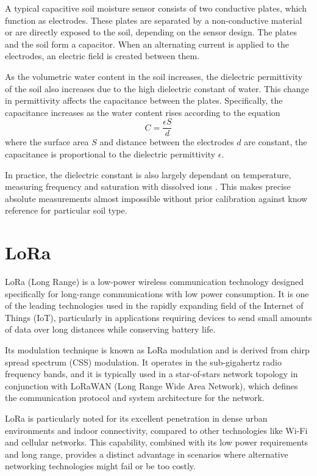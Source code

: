 A typical capacitive soil moisture sensor consists of two conductive plates, which function as electrodes. These plates are separated by a non-conductive material or are directly exposed to the soil, depending on the sensor design. The plates and the soil form a capacitor. When an alternating current is applied to the electrodes, an electric field is created between them.

As the volumetric water content in the soil increases, the dielectric permittivity of the soil also increases due to the high dielectric constant of water. This change in permittivity affects the capacitance between the plates. Specifically, the capacitance increases as the water content rises according to the equation
\begin{equation}
    C = \dfrac{\epsilon S}{d}
\end{equation}
where the surface area $S$ and distance between the electrodes $d$ are constant, the capacitance is proportional to the dielectric permittivity $\epsilon$.

In practice, the dielectric constant is also largely dependant on temperature, measuring frequency and saturation with dissolved ions \cite{meter_group_soil_2023,podest_applications_nodate}. This makes precise absolute measurements almost impossible without prior calibration against know reference for particular soil type.

\section{LoRa}
LoRa (Long Range) is a low-power wireless communication technology designed specifically for long-range communications with low power consumption. It is one of the leading technologies used in the rapidly expanding field of the Internet of Things (IoT), particularly in applications requiring devices to send small amounts of data over long distances while conserving battery life.

Its modulation technique is known as LoRa modulation and is derived from chirp spread spectrum (CSS) modulation. It operates in the sub-gigahertz radio frequency bands, and it is typically used in a star-of-stars network topology in conjunction with LoRaWAN (Long Range Wide Area Network), which defines the communication protocol and system architecture for the network.

LoRa is particularly noted for its excellent penetration in dense urban environments and indoor connectivity, compared to other technologies like Wi-Fi and cellular networks. This capability, combined with its low power requirements and long range, provides a distinct advantage in scenarios where alternative networking technologies might fail or be too costly.
